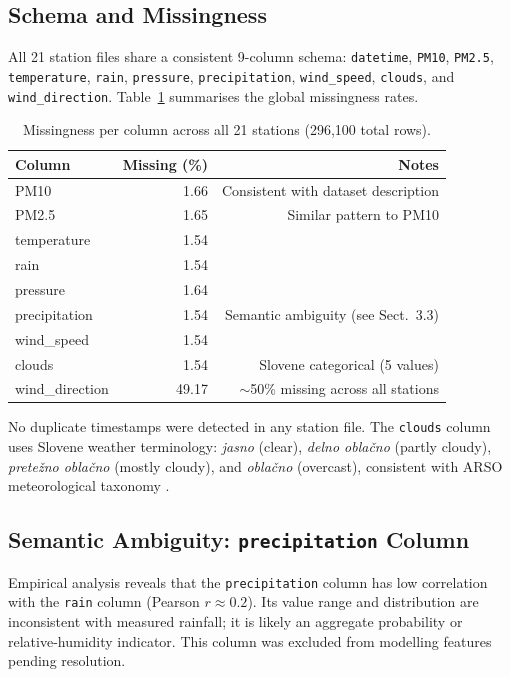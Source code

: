 \documentclass[runningheads]{llncs}
\begin{document}
\subsection{Schema and Missingness}
All 21 station files share a consistent 9-column schema:
\texttt{datetime}, \texttt{PM10}, \texttt{PM2.5}, \texttt{temperature},
\texttt{rain}, \texttt{pressure}, \texttt{precipitation},
\texttt{wind\_speed}, \texttt{clouds}, and \texttt{wind\_direction}.
Table~\ref{tab:missingness} summarises the global missingness rates.

\begin{table}[t]
\caption{Missingness per column across all 21 stations
         (296{,}100 total rows).}\label{tab:missingness}
\centering
\begin{tabular}{lrr}
\toprule
Column & Missing (\%) & Notes\\
\midrule
PM10              & 1.66 & Consistent with dataset description\\
PM2.5             & 1.65 & Similar pattern to PM10\\
temperature       & 1.54 & \\
rain              & 1.54 & \\
pressure          & 1.64 & \\
precipitation     & 1.54 & Semantic ambiguity (see Sect.~3.3)\\
wind\_speed       & 1.54 & \\
clouds            & 1.54 & Slovene categorical (5 values)\\
wind\_direction   & 49.17 & $\sim$50\% missing across all stations\\
\bottomrule
\end{tabular}
\end{table}

No duplicate timestamps were detected in any station file. The
\texttt{clouds} column uses Slovene weather terminology:
\textit{jasno} (clear), \textit{delno obla{\v{c}}no} (partly cloudy),
\textit{prete{\v{z}}no obla{\v{c}}no} (mostly cloudy), and
\textit{obla{\v{c}}no} (overcast), consistent with ARSO meteorological
taxonomy \cite{ref_arso}.

\subsection{Semantic Ambiguity: \texttt{precipitation} Column}
Empirical analysis reveals that the \texttt{precipitation} column has
low correlation with the \texttt{rain} column (Pearson $r \approx 0.2$).
Its value range and distribution are inconsistent with measured rainfall;
it is likely an aggregate probability or relative-humidity indicator.
This column was excluded from modelling features pending resolution.
\end{document}
